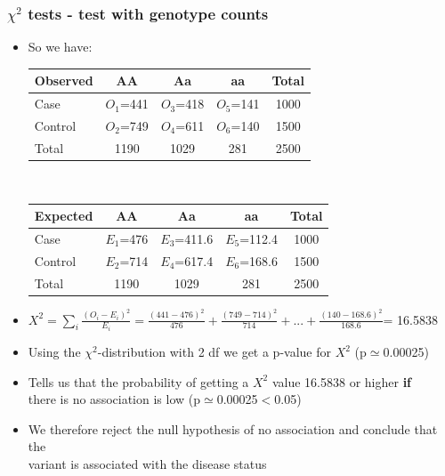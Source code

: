 \documentclass[xcolor=pdftex,dvipsnames,table,10pt]{beamer}
\begin{document}
\begin{frame}
\frametitle{$\chi^2$ tests - test with genotype counts}
\small
\vspace{-0.0cm}
  \begin{itemize}\setlength{\itemindent}{-2.25em}
   \item So we have: \\\vspace{.2cm}
   \footnotesize
\begin{tabular}{|l|c|c|c|c|}
\hline
 \textbf{Observed} & AA & Aa & aa & Total \\
\hline
Case & $O_1$=441 & $O_3$=418\hspace{0.16cm} & $O_5$=141\hspace{0.185cm} & 1000\\
\hline
Control & $O_2$=749 & $O_4$=611\hspace{0.16cm} & $O_6$=140\hspace{0.185cm} & 1500  \\
\hline
Total & 1190 & 1029 & 281 & 2500\\
\hline
\end{tabular}\\\vspace{0.2cm}
 \begin{tabular}{|l|c|c|c|c|}
\hline
 \textbf{Expected} & AA & Aa & aa & Total \\
\hline
Case & $E_1$=476 & $E_3$=411.6 & $E_5$=112.4 & 1000\\
\hline
Control & $E_2$=714 & $E_4$=617.4 & $E_6$=168.6 & 1500  \\
\hline
Total & 1190 & 1029 & 281 & 2500\\
\hline
\end{tabular}
\item<2-> $X^2 = \sum_i \frac{(O_i - E_i)^2}{E_i} = \frac{(441-476)^2}{476}+\frac{(749-714)^2}{714}+... +\frac{(140-168.6)^2}{168.6}$= 16.5838
\item<3-> \small Using the $\chi^2$-distribution with 2 df we get a p-value for $X^2$ (p$\simeq$0.00025)%
\item<4-> \small %
Tells us that the probability of getting a $X^2$ value 16.5838 or higher \textbf{if} \\\hspace{-0.7cm}there is no association is low (p$\simeq$0.00025$<$0.05)
\item<5-> \small We therefore reject the null hypothesis of no association and conclude that the \\\hspace{-0.7cm}variant is associated with the disease status\\\vspace{0.2cm}\end{itemize}


\end{frame}
\end{document}
